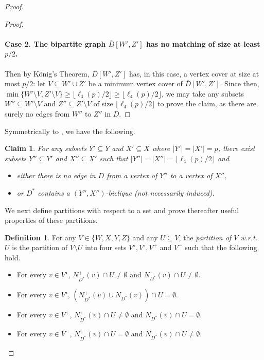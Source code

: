 \documentclass[a4paper,11pt]{article}
\theoremstyle{plain}
\newtheorem{claim}[theorem]{Claim}
\newtheorem{identification rule}{Identification Rule}
\theoremstyle{definition}
\newtheorem{definition}[theorem]{Definition}
\theoremstyle{remark}
\newenvironment{claimproof}{\begin{proof}\renewcommand{\qedsymbol}{\claimqed}}{\end{proof}\renewcommand{\qedsymbol}{\plainqed}}
\let\plainqed\qedsymbol
\newcommand{\claimqed}{$\lrcorner$}
\begin{document}
\begin{proof}
\begin{claimproof}
\paragraph{Case 2. The bipartite graph $\overline{D}[W',Z']$ has no matching of size at least $p/2$.} Then by K\"onig's Theorem, $\overline{D}[W',Z']$ has, in this case, a vertex cover at size at most $p/2$: let $V \subseteq W' \cup Z'$ be a minimum vertex cover of $\overline{D}[W',Z']$. Since then, $\min \{ W' \setminus V,Z' \setminus V\} \geq \lfloor \ell_4(p)/ 2 \rfloor \geq \lfloor \ell_4(p)/2 \rfloor$, we may take any subsets $W'' \subseteq W' \setminus V$ and $Z'' \subseteq Z' \setminus V$ of size $\lfloor \ell_4(p)/2 \rfloor$ to prove the claim, as there are surely no edges from $W''$ to $Z''$ in $D$. 
\end{claimproof}

Symmetrically to , we have the following.

\begin{claim}
\label{clm:ramseyXY}
For any subsets $Y' \subseteq Y$ and $X' \subseteq X$ where $|Y'| = |X'| = p$, there exist subsets 
$Y'' \subseteq Y'$ and $X'' \subseteq X'$ such that $|Y''| = |X''| = \lfloor \ell_4(p)/2 \rfloor$ and
\begin{itemize}
\item[$\bullet$] either there is no edge in $D$ from a vertex of $Y''$ to a vertex of $X''$,
\item[$\bullet$] or $D^*$ contains a $(Y'',X'')$-biclique (not necessarily induced).
\end{itemize}
\end{claim}

We next define partitions with respect to a set and prove thereafter useful properties of these partitions.

\begin{definition}
For any $V \in \{W,X,Y,Z\}$ and any $U \subseteq V$, the \emph{partition of $V$ w.r.t. $U$} is the partition of $V \setminus U$ into four sets $V^\star, V^\circ, V^+$ and $V^-$ such that the following hold.
\begin{itemize}
\item For every $v \in V^\star$, $N^+_{D^*}(v) \cap U \neq \emptyset$ and $N^-_{D^*}(v) \cap U \neq \emptyset$.
\item For every $v \in V^\circ$, $(N^+_{D^*}(v) \cup N^-_{D^*}(v)) \cap U = \emptyset$.
\item For every $v \in V^+$, $N^+_{D^*}(v) \cap U \neq \emptyset$ and $N^-_{D^*}(v) \cap U = \emptyset$.
\item For every $v \in V^-$, $N^+_{D^*}(v) \cap U  = \emptyset$ and $N^-_{D^*}(v) \cap U \neq \emptyset$.
\end{itemize} 
\end{definition}


\end{proof}
\end{document}
